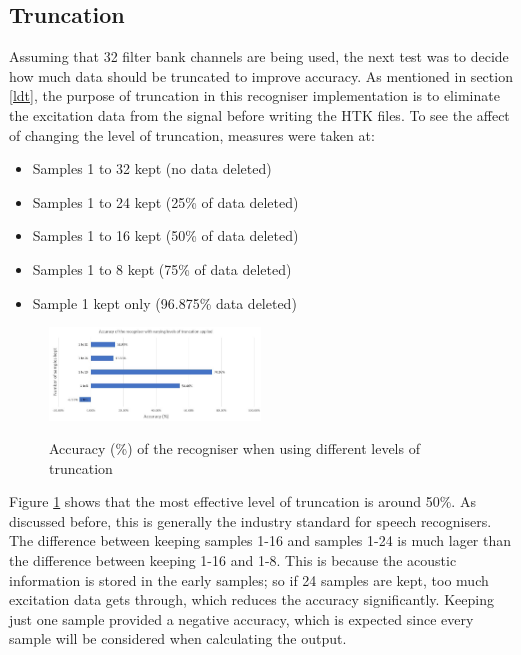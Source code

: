 \documentclass[journal]{IEEEtran}
\begin{document}
	\subsection{Truncation}
	Assuming that 32 filter bank channels are being used, the next test was to decide how much data should be truncated to improve accuracy. As mentioned in section \ref{ldt}, the purpose of truncation in this recogniser implementation is to eliminate the excitation data from the signal before writing the HTK files. To see the affect of changing the level of truncation, measures were taken at:
	\begin{itemize}
		\item Samples 1 to 32 kept (no data deleted)
		\item Samples 1 to 24 kept (25\% of data deleted)
		\item Samples 1 to 16 kept (50\% of data deleted)
		\item Samples 1 to 8 kept (75\% of data deleted)
		\item Sample 1 kept only (96.875\% data deleted)
	\end{itemize}

	\begin{figure}[H]
		\centering
		\captionsetup{justification=centering}
		\includegraphics[width=0.5\textwidth]{eval_truncation.jpg}\\
		\caption{Accuracy (\%) of the recogniser when using different levels of truncation}\label{fig:eval_truncation}
	\end{figure}

	Figure \ref{fig:eval_truncation} shows that the most effective level of truncation is around 50\%. As discussed before, this is generally the industry standard for speech recognisers. The difference between keeping samples 1-16 and samples 1-24 is much lager than the difference between keeping 1-16 and 1-8. This is because the acoustic information is stored in the early samples; so if 24 samples are kept, too much excitation data gets through, which reduces the accuracy significantly. Keeping just one sample provided a negative accuracy, which is expected since every sample will be considered when calculating the output.
	
\end{document}
